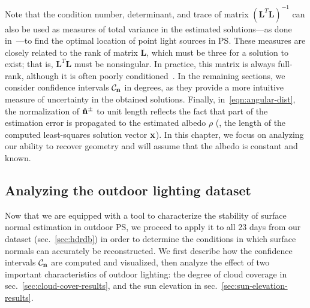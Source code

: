 Note that the condition number, determinant, and trace of matrix $(\mathbf{L}^T\mathbf{L})^{-1}$ can also be used as measures of total variance in the estimated solutions---as done in~\cite{sun-ivc-07}---to find the optimal location of point light sources in PS. These measures are closely related to the rank of matrix $\mathbf{L}$, which must be three for a solution to exist; that is, $\mathbf{L}^T\mathbf{L}$ must be nonsingular. In practice, this matrix is always full-rank, although it is often poorly conditioned~\cite{shen-pg-14}. In the remaining sections, we consider confidence intervals $\mathcal{C}_{\bf n}$ in degrees, as they provide a more intuitive measure of uncertainty in the obtained solutions. Finally, in~\eqref{eqn:angular-dist}, the normalization of ${\bf \hat n}^\pm$ to unit length reflects the fact that part of the estimation error is propagated to the estimated albedo $\rho$ (\ie, the length of the computed least-squares solution vector ${\bf x}$). In this chapter, we focus on analyzing our ability to recover geometry and will assume that the albedo is constant and known.

\subsection{Analyzing the outdoor lighting dataset}
\label{sec:iccp15-datasetanalysis}

Now that we are equipped with a tool to characterize the stability of surface normal estimation in outdoor PS, we proceed to apply it to all 23 days from our dataset (sec.~\ref{sec:hdrdb}) in order to determine the conditions in which surface normals can accurately be reconstructed. We first describe how the confidence intervals $\mathcal{C}_{\bf n}$ are computed and visualized, then analyze the effect of two important characteristics of outdoor lighting: the degree of cloud coverage in sec.~\ref{sec:cloud-cover-results}, and the sun elevation in sec.~\ref{sec:sun-elevation-results}.

